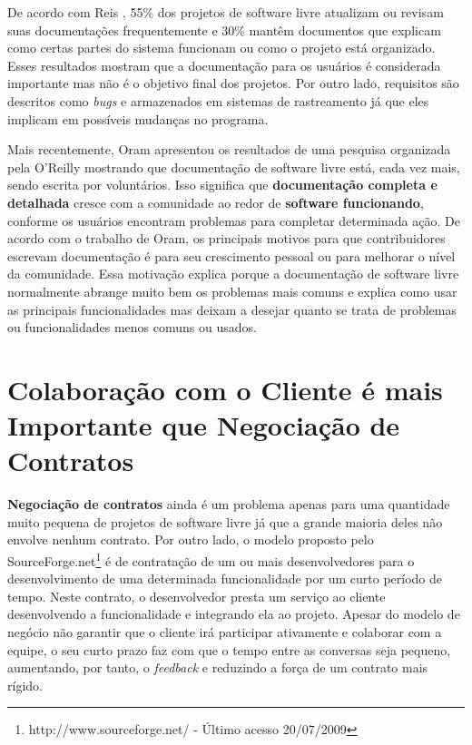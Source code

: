 De acordo com Reis \cite{Reis2003}, 55\% dos projetos de software
livre atualizam ou revisam suas documentações frequentemente e 30\%
mantêm documentos que explicam como certas partes do sistema funcionam
ou como o projeto está organizado. Esses resultados mostram que a
documentação para os usuários é considerada importante mas não é o
objetivo final dos projetos. Por outro lado, requisitos são descritos
como \emph{bugs}
e armazenados em sistemas de rastreamento já que eles implicam em
possíveis mudanças no programa.

Mais recentemente, Oram \cite{Oram2007} apresentou os resultados de
uma pesquisa organizada pela O'Reilly mostrando que documentação de
software livre está, cada vez mais, sendo escrita por
voluntários. Isso significa que \textbf{documentação completa e
  detalhada} cresce com a comunidade ao redor de \textbf{software
  funcionando}, conforme os usuários encontram problemas para
completar determinada ação. De acordo com o trabalho de Oram, os
principais motivos para que contribuidores escrevam documentação é
para seu crescimento pessoal ou para melhorar o nível da
comunidade. Essa motivação explica porque a documentação de software
livre normalmente abrange muito bem os problemas mais comuns e explica
como usar as principais funcionalidades mas deixam a desejar quanto se
trata de problemas ou funcionalidades menos comuns ou usados.

\section{Colaboração com o Cliente é mais Importante que Negociação de
  Contratos}
\label{sec:third-princ}

\textbf{Negociação de contratos} ainda é um problema apenas para uma
quantidade muito pequena de projetos de software livre já que a grande
maioria deles não envolve nenhum contrato.  Por outro lado, o modelo
proposto pelo SourceForge.net\footnote{http://www.sourceforge.net/ -
  Último acesso 20/07/2009} é de contratação de um ou mais
desenvolvedores para o desenvolvimento de uma determinada
funcionalidade por um curto período de tempo. Neste contrato, o
desenvolvedor presta um serviço ao cliente desenvolvendo a
funcionalidade e integrando ela ao projeto. Apesar do modelo de
negócio não garantir que o cliente irá participar ativamente e
colaborar com a equipe, o seu curto prazo faz com que o tempo entre as
conversas seja pequeno, aumentando, por tanto, o \emph{feedback} e
reduzindo a força de um contrato mais rígido.

